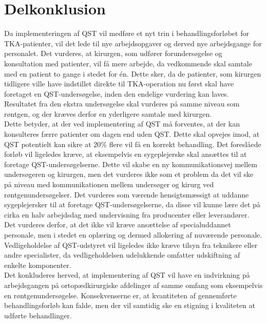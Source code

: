 \section{Delkonklusion}
Da implementeringen af QST vil medføre et nyt trin i behandlingsforløbet for TKA-patienter, vil det lede til nye arbejdsopgaver og derved nye arbejdsgange for personalet. Det vurderes, at kirurgen, som udfører forundersøgelse og konsultation med patienter, vil få mere arbejde, da vedkommende skal samtale med en patient to gange i stedet for én. Dette sker, da de patienter, som kirurgen tidligere ville have indstillet direkte til TKA-operation nu først skal have foretaget en QST-undersøgelse, inden den endelige vurdering kan laves. Resultatet fra den ekstra undersøgelse skal vurderes på samme niveau som røntgen, og der kræves derfor en yderligere samtale med kirurgen. \\
Dette betyder, at der ved implementering af QST må forventes, at der kan konsulteres færre patienter om dagen end uden QST. Dette skal opvejes imod, at QST potentielt kan sikre at 20\% flere vil få en korrekt behandling. Det foreslåede forløb vil ligeledes kræve, at eksempelvis en sygeplejerske skal ansættes til at foretage QST-undersøgelserne. Dette vil skabe en ny kommunikationsvej mellem undersøgeren og kirurgen, men det vurderes ikke som et problem da det vil ske på niveau med kommunikationen mellem undersøger og kirurg ved røntgenundersøgelser. Det vurderes som værende hensigtsmæssigt at uddanne sygeplejersker til at foretage QST-undersøgelserne, da disse vil kunne lære det på cirka en halv arbejdsdag med undervisning fra producenter eller leverandører. Det vurderes derfor, at det ikke vil kræve ansættelse af specialuddannet personale, men i stedet en oplæring og dermed allokering af nuværende personale. Vedligeholdelse af QST-udstyret vil ligeledes ikke kræve tilsyn fra teknikere eller andre specialister, da vedligeholdelsen udelukkende omfatter udskiftning af enkelte komponenter. \\
Det konkluderes herved, at implementering af QST vil have en indvirkning på arbejdsgangen på ortopædkirurgiske afdelinger af samme omfang som eksempelvis en røntgenundersøgelse. Konsekvenserne er, at kvantiteten af gennemførte behandlingsforløb kan falde, men der vil samtidig ske en stigning i kvaliteten at udførte behandlinger. 
